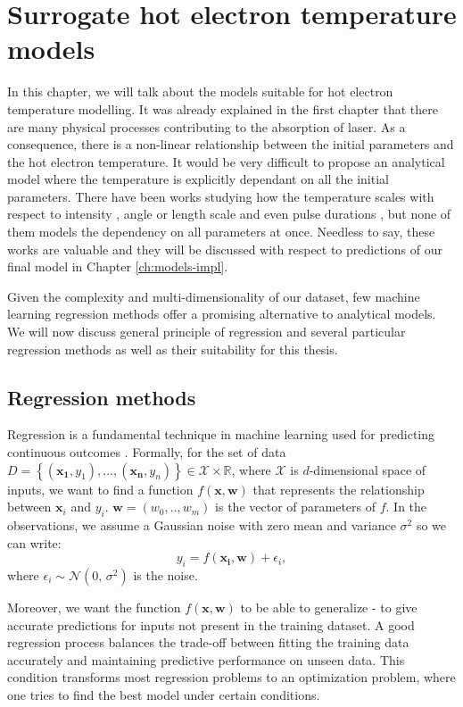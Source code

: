 \chapter{Surrogate hot electron temperature models}
\label{ch:models-theory}
In this chapter, we will talk about the models suitable for hot electron temperature modelling. It was already explained in the first chapter that there are many physical processes contributing to the absorption of laser. As a consequence, there is a non-linear relationship between the initial parameters and the hot electron temperature. It would be very difficult to propose an analytical model where the temperature is explicitly dependant on all the initial parameters. There have been works studying how the temperature scales with respect to intensity \cite{kluge2011,cui2013,miller2023,haines2009,beg1997}, angle \cite{cui2013} or length scale and even pulse durations \cite{miller2023}, but none of them models the dependency on all parameters at once. Needless to say, these works are valuable and they will be discussed with respect to predictions of our final model in Chapter \ref{ch:models-impl}.

Given the complexity and multi-dimensionality of our dataset, few machine learning regression methods offer a promising alternative to analytical models. We will now discuss general principle of regression and several particular regression methods as well as their suitability for this thesis.

\section{Regression methods}
Regression is a fundamental technique in machine learning used for predicting continuous outcomes \cite{bishop2006}. Formally, for the set of data $D = \left\{(\bm{x_1},y_1),...,(\bm{x_n},y_n)\right\}\in \mathcal{X}\times\mathbb{R}$, where $\mathcal{X}$ is $d$-dimensional space of inputs, we want to find a function $f(\bm{x},\bm{w})$ that represents the relationship between $\bm{x}_i$ and $y_i$. $\bm{w} = (w_0,..,w_{m})$ is the vector of parameters of $f$. In the observations, we assume a Gaussian noise with zero mean and variance $\sigma^2$ so we can write:
\begin{equation}
	y_i = f(\bm{x_i},\bm{w}) + \epsilon_i,
\end{equation}
where $\epsilon_i \sim \mathcal{N}(0,\,\sigma^{2})$ is the noise.

Moreover, we want the function $f(\bm{x},\bm{w})$ to be able to generalize - to give accurate predictions for inputs not present in the training dataset. A good regression process balances the trade-off between fitting the training data accurately and maintaining predictive performance on unseen data. This condition transforms most regression problems to an optimization problem, where one tries to find the best model under certain conditions.

